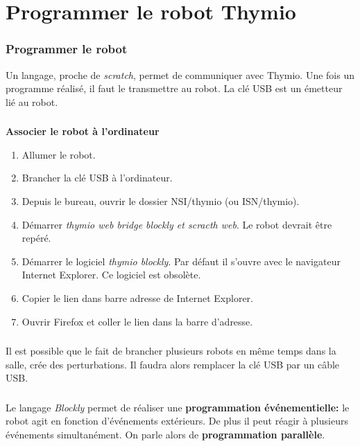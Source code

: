 \documentclass[svgnames,11pt]{beamer}
\begin{document}
\section{Programmer le robot Thymio}
\begin{frame}
    \frametitle{Programmer le robot}

    Un langage, proche de \emph{scratch}, permet de communiquer avec Thymio. Une fois un programme réalisé, il faut le transmettre au robot. La clé USB est un émetteur lié au robot.


\end{frame}
\begin{frame}
    \frametitle{}
    \begin{activite} \textbf{Associer le robot à l'ordinateur}
        \begin{enumerate}    
            \item Allumer le robot.
            \item Brancher la clé USB à l'ordinateur.
            \item Depuis le bureau, ouvrir le dossier NSI/thymio (ou ISN/thymio).
            \item Démarrer \emph{thymio web bridge blockly et scracth web}. Le robot devrait être repéré.
            \item Démarrer le logiciel \emph{thymio blockly}. Par défaut il s'ouvre avec le navigateur Internet Explorer. Ce logiciel est obsolète.
            \item Copier le lien dans barre adresse de Internet Explorer.
            \item Ouvrir Firefox et coller le lien dans la barre d'adresse.
        \end{enumerate}
        \end{activite}
    

\end{frame}
\begin{frame}
    \frametitle{}

    \begin{aretenir}[Remarque]
        Il est possible que le fait de brancher plusieurs robots en même temps dans la salle, crée des perturbations. Il faudra alors remplacer la clé USB par un câble USB.
        \end{aretenir}

\end{frame}
\begin{frame}
    \frametitle{}

    Le langage \emph{Blockly} permet de réaliser une \textbf{programmation événementielle:} le robot agit en fonction d'événements extérieurs. De plus il peut réagir à plusieurs événements simultanément. On parle alors de \textbf{programmation parallèle}.

\end{frame}
\end{document}
